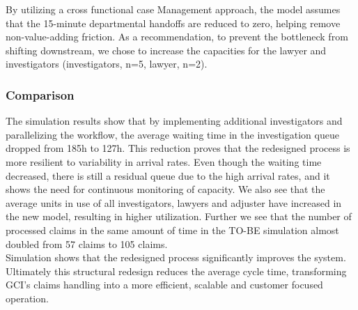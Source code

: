 By utilizing a cross functional case Management approach, the model assumes that the 15-minute departmental handoffs are reduced to zero, helping remove non-value-adding friction. As a recommendation, to prevent the bottleneck from shifting downstream, we chose to increase the capacities for the lawyer and investigators (investigators, n=5, lawyer, n=2).

\subsubsection{Comparison}
The simulation results show that by implementing additional investigators and parallelizing the workflow, the average waiting time in the investigation queue dropped from 185h to 127h. This reduction proves that the redesigned process is more resilient to variability in arrival rates. Even though the waiting time decreased, there is still a residual queue due to the high arrival rates, and it shows the need for continuous monitoring of capacity. We also see that the average units in use of all investigators, lawyers and adjuster have increased in the new model, resulting in higher utilization. Further we see that the number of processed claims in the same amount of time in the TO-BE simulation almost doubled from 57 claims to 105 claims. \\

Simulation shows that the redesigned process significantly improves the system. Ultimately this structural redesign reduces the average cycle time, transforming GCI's claims handling into a more efficient, scalable and customer focused operation. 
